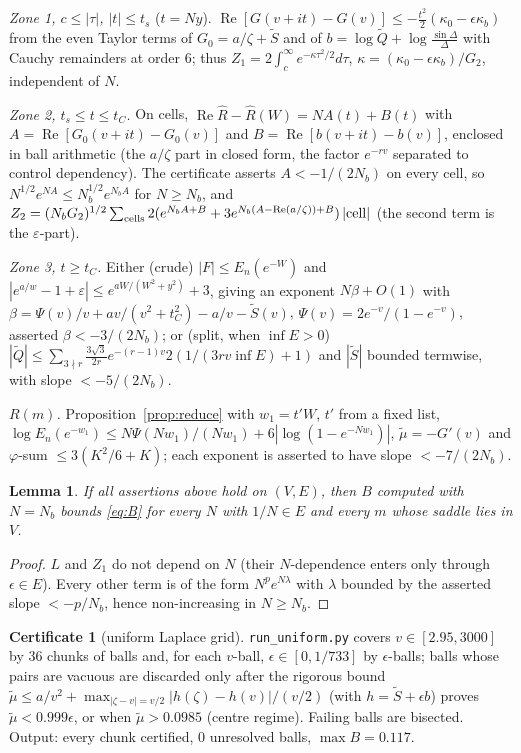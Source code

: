 \documentclass[11pt,reqno]{amsart}
\theoremstyle{plain}
\newtheorem{lemma}[theorem]{Lemma}
\theoremstyle{definition}
\newtheorem{certificate}[theorem]{Certificate}
\newcommand{\Rh}{\widehat R}
\newcommand{\St}{\widetilde S}
\newcommand{\Qt}{\widetilde Q}
\renewcommand{\Re}{\operatorname{Re}}
\begin{document}
\smallskip\noindent\emph{Zone 1, $c\le|\tau|$, $|t|\le t_s$} ($t=Ny$). $\Re[G(v+it)-G(v)]\le-\frac{t^2}2(\kappa_0-\epsilon\kappa_b)$ from the
even Taylor terms of $G_0=a/\zeta+\St$ and of $b=\log\Qt+\log\frac{\sin\Delta}\Delta$ with Cauchy remainders at order $6$; thus
$Z_1=2\int_c^\infty e^{-\kappa\tau^2/2}d\tau$, $\kappa=(\kappa_0-\epsilon\kappa_b)/G_2$, independent of $N$.

\smallskip\noindent\emph{Zone 2, $t_s\le t\le t_C$.} On cells, $\Re\Rh-\Rh(W)=NA(t)+B(t)$ with $A=\Re[G_0(v+it)-G_0(v)]$ and $B=\Re[b(v+it)-b(v)]$,
enclosed in ball arithmetic (the $a/\zeta$ part in closed form, the factor $e^{-rv}$ separated to control dependency). The
certificate asserts $A<-1/(2N_b)$ on every cell, so $N^{1/2}e^{NA}\le N_b^{1/2}e^{N_bA}$ for $N\ge N_b$, and
$Z_2=(N_bG_2)^{1/2}\sum_{\rm cells}2(e^{N_bA+B}+3e^{N_b(A-\Re(a/\zeta))+B})\,|{\rm cell}|$ (the second term is the $\varepsilon$-part).

\smallskip\noindent\emph{Zone 3, $t\ge t_C$.} Either (crude) $|F|\le E_n(e^{-W})$ and $|e^{a/w}-1+\varepsilon|\le e^{aW/(W^2+y^2)}+3$, giving an exponent
$N\beta+O(1)$ with $\beta=\Psi(v)/v+av/(v^2+t_C^2)-a/v-\St(v)$, $\Psi(v)=2e^{-v}/(1-e^{-v})$, asserted $\beta<-3/(2N_b)$; or (split, when
$\inf E>0$) $|\Qt|\le\sum_{3\nmid r}\frac{3\sqrt3}{2r}e^{-(r-1)v}2(1/(3rv\inf E)+1)$ and $|\St|$ bounded termwise, with slope $<-5/(2N_b)$.

\smallskip\noindent\emph{$R(m)$.} Proposition~\ref{prop:reduce} with $w_1=t'W$, $t'$ from a fixed list, $\log E_n(e^{-w_1})\le N\Psi(Nw_1)/(Nw_1)+6|\log(1-e^{-Nw_1})|$,
$\widetilde\mu=-G'(v)$ and $\varphi$-sum $\le3(K^2/6+K)$; each exponent is asserted to have slope $<-7/(2N_b)$.

\begin{lemma}\label{lem:monotone}
If all assertions above hold on $(V,E)$, then $B$ computed with $N=N_b$ bounds \eqref{eq:B} for every $N$ with $1/N\in E$ and every
$m$ whose saddle lies in $V$.
\end{lemma}
\begin{proof}
$L$ and $Z_1$ do not depend on $N$ (their $N$-dependence enters only through $\epsilon\in E$). Every other term is of the form
$N^pe^{N\lambda}$ with $\lambda$ bounded by the asserted slope $<-p/N_b$, hence non-increasing in $N\ge N_b$.
\end{proof}

\begin{certificate}[uniform Laplace grid]\label{cert:laplace}
\texttt{run\_uniform.py} covers $v\in[2.95,3000]$ by $36$ chunks of balls and, for each $v$-ball, $\epsilon\in[0,1/733]$ by
$\epsilon$-balls; balls whose pairs are vacuous are discarded only after the rigorous bound
$\widetilde\mu\le a/v^2+\max_{|\zeta-v|=v/2}|h(\zeta)-h(v)|/(v/2)$ (with $h=\St+\epsilon b$) proves $\widetilde\mu<0.999\epsilon$, or when
$\widetilde\mu>0.0985$ (centre regime). Failing balls are bisected. Output: every chunk certified, $0$ unresolved balls,
$\max B=0.117$.
\end{certificate}
\end{document}
